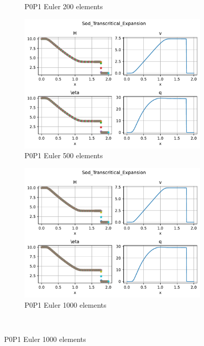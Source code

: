 \documentclass[english]{article}
\theoremstyle{thmstyleone}
\theoremstyle{thmstyletwo}
\theoremstyle{thmstylethree}
\begin{document}
\begin{figure}
{\begin{minipage}{\textwidth}
\begin{subfigure}{0.45\textwidth}
				\caption{P0P1 Euler 200 elements}
			\end{subfigure}
			\begin{subfigure}{0.45\textwidth}
				\includegraphics[trim= 0 180 0 0, clip,width=\textwidth]{figures/transcritical_expansion/P0P1_Euler_N_el00500.pdf}
				\caption{P0P1 Euler 500 elements}
			\end{subfigure}
			\begin{subfigure}{0.45\textwidth}
				\includegraphics[trim= 0 180 0 0, clip,width=\textwidth]{figures/transcritical_expansion/P0P1_Euler_N_el01000.pdf}
				\caption{P0P1 Euler 1000 elements}
			\end{subfigure}\\
			\vspace{2.em}

\end{minipage}}
\end{figure}
\end{document}
